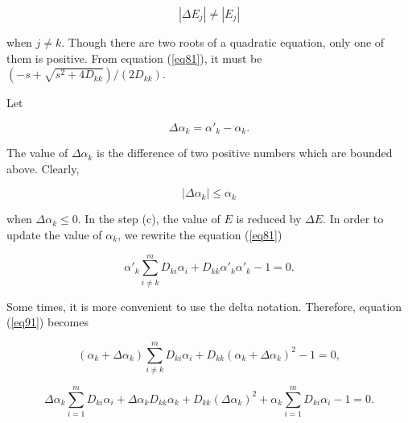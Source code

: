 \documentclass [18pt]{article}
\begin{document}
\begin{equation}
\label{eq88}
\left| {\Delta E_j } \right| \ne \left| {E_j } \right|
\end{equation}



\noindent
when $j \ne k$. Though there are two roots of a quadratic equation, only one
of them is positive. From equation (\ref{eq81}), it must be $( - s + \sqrt {s^2 +
4D_{kk} } ) / (2D_{kk} )$.

Let


\begin{equation}
\label{eq89}
\Delta \alpha _k = \alpha '_k - \alpha _k .
\end{equation}



The value of $\Delta \alpha _k $ is the difference of two positive numbers
which are bounded above. Clearly,


\begin{equation}
\label{eq90}
\left| {\Delta \alpha _k } \right| \le \alpha _k
\end{equation}



\noindent
when $\Delta \alpha _k \le 0$. In the step (c), the value of $E$ is reduced
by $\Delta E$. In order to update the value of $\alpha _k $, we rewrite the
equation (\ref{eq81})


\begin{equation}
\label{eq91}
\alpha '_k \sum\limits_{i \ne k}^m {D_{ki} \alpha _i } + D_{kk} \alpha '_k
\alpha '_k - 1 = 0.
\end{equation}



Some times, it is more convenient to use the delta notation. Therefore,
equation (\ref{eq91}) becomes


\begin{equation}
\label{eq92}
(\alpha _k + \Delta \alpha _k )\sum\limits_{i \ne k}^m {D_{ki} \alpha _i } +
D_{kk} (\alpha _k + \Delta \alpha _k )^2 - 1 = 0,
\end{equation}




\begin{equation}
\label{eq93}
\Delta \alpha _k \sum\limits_{i = 1}^m {D_{ki} \alpha _i } + \Delta \alpha
_k D_{kk} \alpha _k + D_{kk} (\Delta \alpha _k )^2 + \alpha _k
\sum\limits_{i = 1}^m {D_{ki} \alpha _i } - 1 = 0.
\end{equation}
\end{document}
